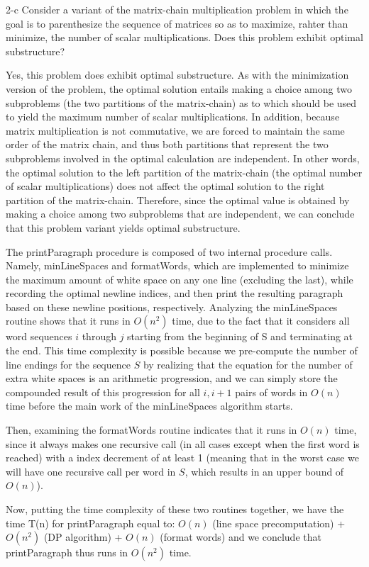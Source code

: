 \documentclass[11pt]{article}
\begin{document}
\begin{prob}{2-c}
Consider a variant of the matrix-chain multiplication problem in which the goal is to parenthesize the sequence of matrices so as to maximize, rahter than minimize, the number of scalar multiplications. Does this problem exhibit optimal substructure?
\end{prob}
\begin{sol}
Yes, this problem does exhibit optimal substructure. As with the minimization version of the problem, the optimal solution entails making a choice among two subproblems (the two partitions of the matrix-chain) as to which should be used to yield the maximum number of scalar multiplications. In addition, because matrix multiplication is not commutative, we are forced to maintain the same order of the matrix chain, and thus both partitions that represent the two subproblems involved in the optimal calculation are independent. In other words, the optimal solution to the left partition of the matrix-chain (the optimal number of scalar multiplications) does not affect the optimal solution to the right partition of the matrix-chain. Therefore, since the optimal value is obtained by making a choice among two subproblems that are independent, we can conclude that this problem variant yields optimal substructure.
\end{sol}

\begin{prob}{3}
\end{prob}
\begin{sol}
The printParagraph procedure is composed of two internal procedure calls. Namely, minLineSpaces and formatWords, which are implemented to minimize the maximum amount of white space on any one line (excluding the last), while recording the optimal newline indices, and then print the resulting paragraph based on these newline positions, respectively. Analyzing the minLineSpaces routine shows that it runs in $O(n^2)$ time, due to the fact that it considers all word sequences $i$ through $j$ starting from the beginning of S and terminating at the end. This time complexity is possible because we pre-compute the number of line endings for the sequence $S$ by realizing that the equation for the number of extra white spaces is an arithmetic progression, and we can simply store the compounded result of this progression for all $i,i+1$ pairs of words in $O(n)$ time before the main work of the minLineSpaces algorithm starts.

Then, examining the formatWords routine indicates that it runs in $O(n)$ time, since it always makes one recursive call (in all cases except when the first word is reached) with a index decrement of at least 1 (meaning that in the worst case we will have one recursive call per word in $S$, which results in an upper bound of $O(n)$).

Now, putting the time complexity of these two routines together, we have the time T(n) for printParagraph equal to: $O(n)$ (line space precomputation) + $O(n^2)$ (DP algorithm) + $O(n)$ (format words) and we conclude that printParagraph thus runs in $O(n^2)$ time.
\end{sol}
\end{document}
